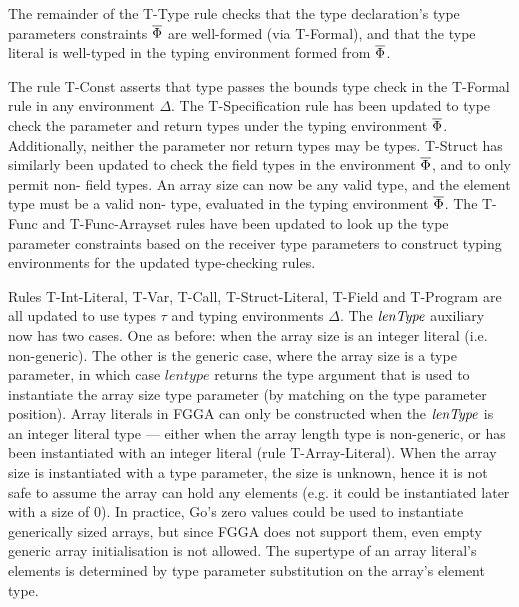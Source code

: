 The remainder of the T-Type rule checks that the type declaration's type
parameters constraints $\overline{\Phi}$ are well-formed (via T-Formal), and that the
type literal is well-typed in the typing environment formed from $\overline{\Phi}$.

The rule T-Const asserts that  type passes the bounds type check in
the T-Formal rule in any environment $\Delta$. The T-Specification rule has been
updated to type check the parameter and return types under the typing
environment $\overline{\Phi}$. Additionally, neither the parameter nor return types
may be  types. T-Struct has similarly been updated to check the field
types in the environment $\overline{\Phi}$, and to only permit non- field
types. An array size can now be any valid  type, and the element type
must be a valid non- type, evaluated in the typing environment
$\overline{\Phi}$. The T-Func and T-Func-Arrayset rules have been updated to look up
the type parameter constraints based on the receiver type parameters to
construct typing environments for the updated type-checking rules.

Rules T-Int-Literal, T-Var, T-Call, T-Struct-Literal, T-Field and T-Program are
all updated to use types $\tau$ and typing environments $\Delta$. The $\mathit{lenType}$
auxiliary now has two cases. One as before: when the array size is an integer
literal (i.e. non-generic). The other is the generic case, where the array size
is a type parameter, in which case $lentype$ returns the type argument that is
used to instantiate the array size type parameter (by matching on the type
parameter position). Array literals in FGGA can only be constructed when the
$\mathit{lenType}$ is an integer literal type --- either when the array length type is
non-generic, or has been instantiated with an integer literal (rule
T-Array-Literal). When the array size is instantiated with a type parameter, the
size is unknown, hence it is not safe to assume the array can hold any elements
(e.g. it could be instantiated later with a size of 0). In practice, Go's zero
values could be used to instantiate generically sized arrays, but since FGGA
does not support them, even empty generic array initialisation is not allowed.
The supertype of an array literal's elements is determined by type parameter
substitution on the array's element type.

